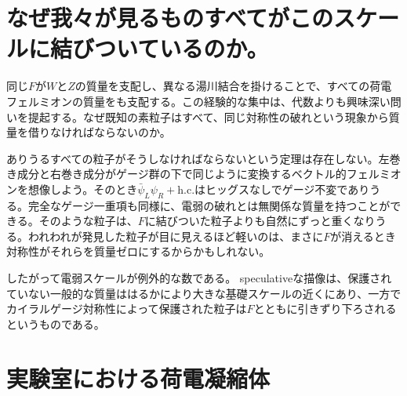 \section{なぜ我々が見るものすべてがこのスケールに結びついているのか。}

同じ\(F\)が\(W\)と\(Z\)の質量を支配し、異なる湯川結合を掛けることで、すべての荷電フェルミオンの質量をも支配する。この経験的な集中は、代数よりも興味深い問いを提起する。なぜ既知の素粒子はすべて、同じ対称性の破れという現象から質量を借りなければならないのか。

ありうるすべての粒子がそうしなければならないという定理は存在しない。左巻き成分と右巻き成分がゲージ群の下で同じように変換するベクトル的フェルミオンを想像しよう。そのとき\(\bar\psi_L\psi_R+\mathrm{h.c.}\)はヒッグスなしでゲージ不変でありうる。完全なゲージ一重項も同様に、電弱の破れとは無関係な質量を持つことができる。そのような粒子は、\(F\)に結びついた粒子よりも自然にずっと重くなりうる。われわれが発見した粒子が目に見えるほど軽いのは、まさに\(F\)が消えるとき対称性がそれらを質量ゼロにするからかもしれない。

したがって電弱スケールが例外的な数である。 speculativeな描像は、保護されていない一般的な質量ははるかにより大きな基礎スケールの近くにあり、一方でカイラルゲージ対称性によって保護された粒子は\(F\)とともに引きずり下ろされるというものである。

\begin{classroomqa}
\end{classroomqa}

\begin{classroomqa}
\end{classroomqa}

\section{実験室における荷電凝縮体}

